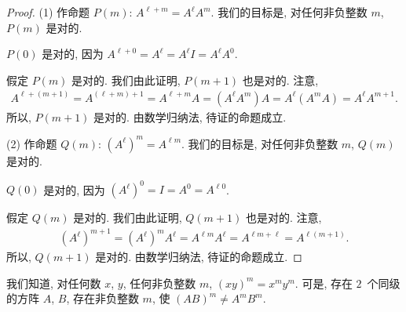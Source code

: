 \documentclass[../libro.tex]{subfiles}
\begin{document}
\begin{proof}
    (1)
    作命题 \(P(m)\):
    \(A^{\ell+m} = A^{\ell} A^{m}\).
    我们的目标是,
    对任何非负整数 \(m\), \(P(m)\) 是对的.

    \(P(0)\) 是对的, 因为
    \(A^{\ell+0} = A^{\ell} = A^{\ell} I = A^{\ell} A^{0}\).

    假定 \(P(m)\) 是对的.
    我们由此证明, \(P(m+1)\) 也是对的.
    注意,
    \begin{align*}
        A^{\ell+(m+1)}
        = A^{(\ell+m)+1}
        = A^{\ell+m} A
        = (A^{\ell} A^{m}) A
        = A^{\ell} (A^{m} A)
        = A^{\ell} A^{m+1}.
    \end{align*}
    所以, \(P(m+1)\) 是对的.
    由数学归纳法, 待证的命题成立.

    (2)
    作命题 \(Q(m)\):
    \((A^{\ell})^{m} = A^{\ell m}\).
    我们的目标是,
    对任何非负整数 \(m\), \(Q(m)\) 是对的.

    \(Q(0)\) 是对的, 因为
    \((A^{\ell})^{0} = I = A^{0} = A^{\ell 0}\).

    假定 \(Q(m)\) 是对的.
    我们由此证明, \(Q(m+1)\) 也是对的.
    注意,
    \begin{align*}
        (A^{\ell})^{m+1}
        = (A^{\ell})^{m} A^{\ell}
        = A^{\ell m} A^{\ell}
        = A^{\ell m + \ell}
        = A^{\ell (m+1)}.
    \end{align*}
    所以, \(Q(m+1)\) 是对的.
    由数学归纳法, 待证的命题成立.
\end{proof}

我们知道, 对任何数 \(x\), \(y\), 任何非负整数 \(m\),
\((xy)^m = x^m y^m\).
可是, 存在 \(2\)~个同级的方阵 \(A\), \(B\), 存在非负整数 \(m\),
使 \((AB)^m \neq A^m B^m\).
\end{document}
